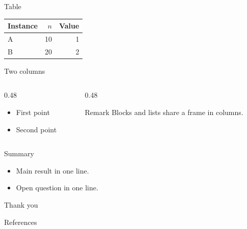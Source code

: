 \documentclass[aspectratio=169,11pt]{beamer}
\begin{document}
\begin{frame}{Table}
  \centering
  \begin{tabular}{lrr}
    \toprule
    Instance & $n$ & Value\\
    \midrule
    A & 10 & 1\\
    B & 20 & 2\\
    \bottomrule
  \end{tabular}
\end{frame}

\begin{frame}{Two columns}
  \begin{columns}[T]
    \begin{column}{0.48\textwidth}
      \begin{itemize}
        \item<1-> First point
        \item<2-> Second point
      \end{itemize}
    \end{column}
    \begin{column}{0.48\textwidth}
      \begin{block}{Remark}
        Blocks and lists share a frame in columns.
      \end{block}
    \end{column}
  \end{columns}
\end{frame}

\begin{frame}{Summary}
  \begin{itemize}
    \item Main result in one line.
    \item Open question in one line.
  \end{itemize}
\end{frame}

\begin{frame}[standout]
  Thank you
\end{frame}

\appendix

\begin{frame}{References}
  \nocite{NagamochiKameda1996}
  
  
\end{frame}
\end{document}
